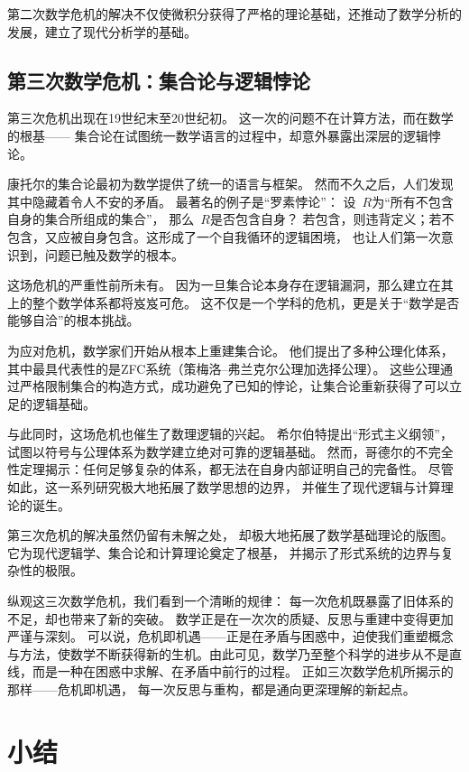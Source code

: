 第二次数学危机的解决不仅使微积分获得了严格的理论基础，还推动了数学分析的发展，建立了现代分析学的基础。

\subsection{第三次数学危机：集合论与逻辑悖论}

第三次危机出现在19世纪末至20世纪初。  
这一次的问题不在计算方法，而在数学的根基——  
集合论在试图统一数学语言的过程中，却意外暴露出深层的逻辑悖论。

康托尔的集合论最初为数学提供了统一的语言与框架。  
然而不久之后，人们发现其中隐藏着令人不安的矛盾。  
最著名的例子是“罗素悖论”：  
设~$R$为“所有不包含自身的集合所组成的集合”，  
那么~$R$是否包含自身？  
若包含，则违背定义；若不包含，又应被自身包含。这形成了一个自我循环的逻辑困境，  
也让人们第一次意识到，问题已触及数学的根本。

这场危机的严重性前所未有。  
因为一旦集合论本身存在逻辑漏洞，那么建立在其上的整个数学体系都将岌岌可危。  
这不仅是一个学科的危机，更是关于“数学是否能够自洽”的根本挑战。

为应对危机，数学家们开始从根本上重建集合论。  
他们提出了多种公理化体系，其中最具代表性的是ZFC系统（策梅洛–弗兰克尔公理加选择公理）。  
这些公理通过严格限制集合的构造方式，成功避免了已知的悖论，让集合论重新获得了可以立足的逻辑基础。

与此同时，这场危机也催生了数理逻辑的兴起。  
希尔伯特提出“形式主义纲领”，试图以符号与公理体系为数学建立绝对可靠的逻辑基础。  
然而，哥德尔的不完全性定理揭示：任何足够复杂的体系，都无法在自身内部证明自己的完备性。    
尽管如此，这一系列研究极大地拓展了数学思想的边界，  
并催生了现代逻辑与计算理论的诞生。

第三次危机的解决虽然仍留有未解之处，  
却极大地拓展了数学基础理论的版图。  
它为现代逻辑学、集合论和计算理论奠定了根基，  
并揭示了形式系统的边界与复杂性的极限。  

纵观这三次数学危机，我们看到一个清晰的规律：  
每一次危机既暴露了旧体系的不足，却也带来了新的突破。  
数学正是在一次次的质疑、反思与重建中变得更加严谨与深刻。  
可以说，危机即机遇——正是在矛盾与困惑中，迫使我们重塑概念与方法，使数学不断获得新的生机。由此可见，数学乃至整个科学的进步从不是直线，而是一种在困惑中求解、在矛盾中前行的过程。
正如三次数学危机所揭示的那样——危机即机遇，  
每一次反思与重构，都是通向更深理解的新起点。

\section{小结}

